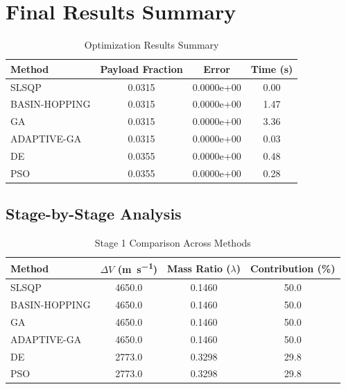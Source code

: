 \documentclass{article}
\begin{document}
\section{Final Results Summary}
\begin{table}[H]
\centering
\caption{Optimization Results Summary}
\begin{tabular}{lS[table-format=1.4]S[table-format=1.4e-1]S[table-format=1.2]}
\toprule
Method & {Payload Fraction} & {Error} & {Time (\si{\second})} \\
\midrule
SLSQP        & 0.0315 & 0.0000e+00 & 0.00 \\
BASIN-HOPPING & 0.0315 & 0.0000e+00 & 1.47 \\
GA           & 0.0315 & 0.0000e+00 & 3.36 \\
ADAPTIVE-GA  & 0.0315 & 0.0000e+00 & 0.03 \\
DE           & 0.0355 & 0.0000e+00 & 0.48 \\
PSO          & 0.0355 & 0.0000e+00 & 0.28 \\
\bottomrule
\end{tabular}
\end{table}

\subsection{Stage-by-Stage Analysis}


\begin{table}[H]
\centering
\caption{Stage 1 Comparison Across Methods}
\begin{tabular}{lS[table-format=4.1]S[table-format=1.4]S[table-format=3.1]}
\toprule
Method & {$\Delta V$ (\si{\meter\per\second})} & {Mass Ratio ($\lambda$)} & {Contribution (\%)} \\
\midrule
SLSQP        & 4650.0 & 0.1460 & 50.0 \\
BASIN-HOPPING & 4650.0 & 0.1460 & 50.0 \\
GA           & 4650.0 & 0.1460 & 50.0 \\
ADAPTIVE-GA  & 4650.0 & 0.1460 & 50.0 \\
DE           & 2773.0 & 0.3298 & 29.8 \\
PSO          & 2773.0 & 0.3298 & 29.8 \\
\bottomrule
\end{tabular}
\end{table}
\end{document}
